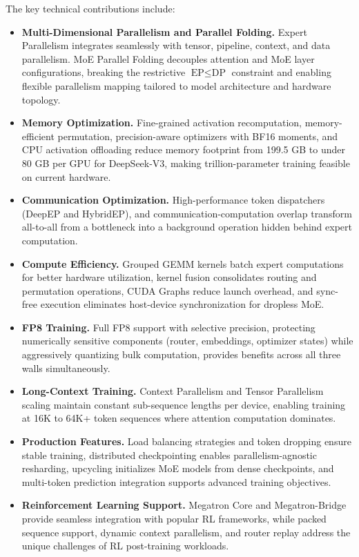\documentclass[10pt,logo,copyright]{nvidiatechreport}
\begin{document}
The key technical contributions include:
\begin{itemize}
    \item \textbf{Multi-Dimensional Parallelism and Parallel Folding.} Expert Parallelism integrates seamlessly with tensor, pipeline, context, and data parallelism. MoE Parallel Folding decouples attention and MoE layer configurations, breaking the restrictive $\text{EP} \leq \text{DP}$ constraint and enabling flexible parallelism mapping tailored to model architecture and hardware topology.

    \item \textbf{Memory Optimization.} Fine-grained activation recomputation, memory-efficient permutation, precision-aware optimizers with BF16 moments, and CPU activation offloading reduce memory footprint from 199.5 GB to under 80 GB per GPU for DeepSeek-V3, making trillion-parameter training feasible on current hardware.

    \item \textbf{Communication Optimization.} High-performance token dispatchers (DeepEP and HybridEP), and communication-computation overlap transform all-to-all from a bottleneck into a background operation hidden behind expert computation.

    \item \textbf{Compute Efficiency.} Grouped GEMM kernels batch expert computations for better hardware utilization, kernel fusion consolidates routing and permutation operations, CUDA Graphs reduce launch overhead, and sync-free execution eliminates host-device synchronization for dropless MoE.

    \item \textbf{FP8 Training.} Full FP8 support with selective precision, protecting numerically sensitive components (router, embeddings, optimizer states) while aggressively quantizing bulk computation, provides benefits across all three walls simultaneously.

    \item \textbf{Long-Context Training.} Context Parallelism and Tensor Parallelism scaling maintain constant sub-sequence lengths per device, enabling training at 16K to 64K+ token sequences where attention computation dominates.

    \item \textbf{Production Features.} Load balancing strategies and token dropping ensure stable training, distributed checkpointing enables parallelism-agnostic resharding, upcycling initializes MoE models from dense checkpoints, and multi-token prediction integration supports advanced training objectives.

    \item \textbf{Reinforcement Learning Support.} Megatron Core and Megatron-Bridge provide seamless integration with popular RL frameworks, while packed sequence support, dynamic context parallelism, and router replay address the unique challenges of RL post-training workloads.
\end{itemize}
\end{document}
